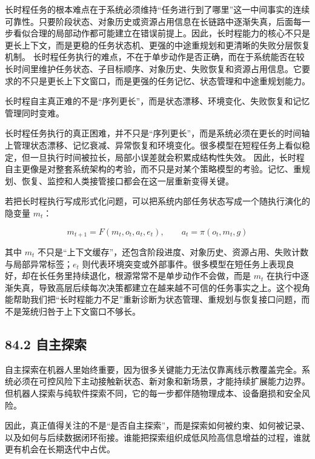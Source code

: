 长时程任务的根本难点在于系统必须维持“任务进行到了哪里”这一中间事实的连续可靠性。只要阶段状态、对象历史或资源占用信息在长链路中逐渐失真，后面每一步看似合理的局部动作都可能建立在错误前提上。因此，长时程能力的核心不只是更长上下文，而是更稳的任务状态机、更强的中途重规划和更清晰的失败分层恢复机制。 长时程任务执行的难点，不在于单步动作是否正确，而在于系统能否在较长时间里维护任务状态、子目标顺序、对象历史、失败恢复和资源占用信息。它要求的不只是更长上下文窗口，而是更强的任务记忆、状态管理和中途重规划能力。

长时程自主真正难的不是“序列更长”，而是状态漂移、环境变化、失败恢复和记忆管理同时变难。

长时程任务执行的真正困难，并不只是“序列更长”，而是系统必须在更长的时间轴上管理状态漂移、记忆衰减、异常恢复和环境变化。很多模型在短程任务上看似稳定，但一旦执行时间被拉长，局部小误差就会积累成结构性失效。 因此，长时程自主更像是对整套系统架构的考验，而不只是对某个策略模型的考验。记忆、重规划、恢复、监控和人类接管接口都会在这一层重新变得关键。

若把长时程执行写成形式化问题，可以把系统内部任务状态写成一个随执行演化的隐变量 \(m_t\)：

\begingroup
\footnotesize
\begin{equation*}
m_{t+1} = F(m_t, o_t, a_t, e_t), \qquad
a_t = \pi(o_t, m_t, g)
\end{equation*}
\endgroup

其中 \(m_t\) 不只是“上下文缓存”，还包含阶段进度、对象历史、资源占用、失败计数与局部异常标签；\(e_t\) 则代表环境突变或外部事件。很多模型在短任务上表现良好，却在长任务里持续退化，根源常常不是单步动作不会做，而是 \(m_t\) 在执行中逐渐失真，导致高层后续每次决策都建立在越来越不可信的任务事实之上。这个视角能帮助我们把“长时程能力不足”重新诊断为状态管理、重规划与恢复接口问题，而不是笼统归咎于上下文窗口不够长。

\subsection*{84.2 自主探索}


自主探索在机器人里始终重要，因为很多关键能力无法仅靠离线示教覆盖完全。系统必须在可控风险下主动接触新状态、新对象和新场景，才能持续扩展能力边界。但机器人探索与纯软件探索不同，它的每一步都伴随物理成本、设备磨损和安全风险。

因此，真正值得关注的不是“是否自主探索”，而是探索如何被约束、如何被记录、以及如何与后续数据闭环衔接。谁能把探索组织成低风险高信息增益的过程，谁就更有机会在长期迭代中占优。

